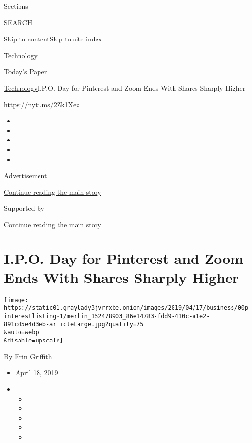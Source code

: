 Sections

SEARCH

\protect\hyperlink{site-content}{Skip to
content}\protect\hyperlink{site-index}{Skip to site index}

\href{https://www.nytimes3xbfgragh.onion/section/technology}{Technology}

\href{https://myaccount.nytimes3xbfgragh.onion/auth/login?response_type=cookie\&client_id=vi}{}

\href{https://www.nytimes3xbfgragh.onion/section/todayspaper}{Today's
Paper}

\href{/section/technology}{Technology}\textbar{}I.P.O. Day for Pinterest
and Zoom Ends With Shares Sharply Higher

\url{https://nyti.ms/2Zk1Xez}

\begin{itemize}
\item
\item
\item
\item
\item
\end{itemize}

Advertisement

\protect\hyperlink{after-top}{Continue reading the main story}

Supported by

\protect\hyperlink{after-sponsor}{Continue reading the main story}

\hypertarget{ipo-day-for-pinterest-and-zoom-ends-with-shares-sharply-higher}{%
\section{I.P.O. Day for Pinterest and Zoom Ends With Shares Sharply
Higher}\label{ipo-day-for-pinterest-and-zoom-ends-with-shares-sharply-higher}}

\texttt{[image: https://static01.graylady3jvrrxbe.onion/images/2019/04/17/business/00pinterestlisting-1/merlin\_152478903\_86e14783-fdd9-410c-a1e2-891cd5e4d3eb-articleLarge.jpg?quality=75\\\&auto=webp\\\&disable=upscale]}

By \href{https://www.nytimes3xbfgragh.onion/by/erin-griffith}{Erin
Griffith}

\begin{itemize}
\item
  April 18, 2019
\item
  \begin{itemize}
  \item
  \item
  \item
  \item
  \item
  \end{itemize}
\end{itemize}

